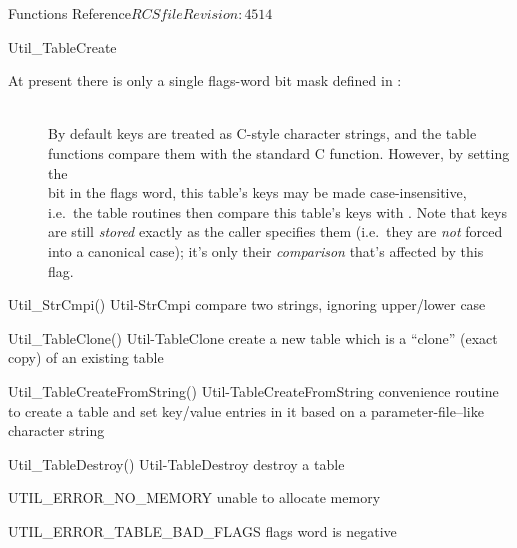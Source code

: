 \begin{cactuspart}{ Functions Reference}{$RCSfile$}{$Revision: 4514 $}
\begin{FunctionDescription}{Util\_TableCreate}
\begin{Discussion}
At present there is only a single flags-word bit mask defined
in :
\begin{description}
\item[]\mbox{}\\
        By default keys are treated as C-style character strings,
        and the table functions compare them with the standard C
         function.
        However, by setting the\\
        bit in the flags word, this table's keys may be made
        case-insensitive, i.e.\ the table routines then compare
        this table's keys with .
        Note that keys are still {\em stored\/} exactly as
        the caller specifies them (i.e.\ they are {\em not\/}
        forced into a canonical case); it's only their
        {\em comparison\/} that's affected by this flag.
\end{description}
\end{Discussion}

\begin{SeeAlsoSection}
\begin{SeeAlso2} {Util\_StrCmpi()} {Util-StrCmpi}
compare two strings, ignoring upper/lower case
\end{SeeAlso2}
\begin{SeeAlso2} {Util\_TableClone()} {Util-TableClone}
create a new table which is a ``clone'' (exact copy) of an existing
table
\end{SeeAlso2}
\begin{SeeAlso2} {Util\_TableCreateFromString()} {Util-TableCreateFromString}
convenience routine to create a table and set key/value entries
in it based on a parameter-file--like character string
\end{SeeAlso2}
\begin{SeeAlso2} {Util\_TableDestroy()} {Util-TableDestroy}
destroy a table
\end{SeeAlso2}
\end{SeeAlsoSection}

\begin{ErrorSection}
\begin{Error}{UTIL\_ERROR\_NO\_MEMORY}
unable to allocate memory
\end{Error}
\begin{Error}{UTIL\_ERROR\_TABLE\_BAD\_FLAGS}
flags word is negative
\end{Error}
\end{ErrorSection}


\end{FunctionDescription}
\end{cactuspart}
